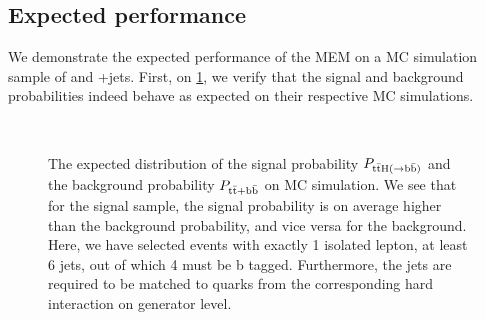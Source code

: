 \subsection{Expected performance}
We demonstrate the expected performance of the MEM on a MC simulation sample of \ttH and \ttbar+jets. First, on \cref{fig:mem_proba}, we verify that the signal and background probabilities indeed behave as expected on their respective MC simulations.

\begin{figure}
\begin{centering}
\\
\caption{The expected distribution of the signal probability $P_{\mathrm{t} \bar{\mathrm{t}} \mathrm{H} (\rightarrow \mathrm{b}\bar{\mathrm{b}})}$ and the background probability $P_{\mathrm{t} \bar{\mathrm{t}} + \mathrm{b}\bar{\mathrm{b}}}$ on MC simulation. We see that for the signal sample, the signal probability is on average higher than the background probability, and vice versa for the background. Here, we have selected events with exactly 1 isolated lepton, at least 6 jets, out of which 4 must be b tagged. Furthermore, the jets are required to be matched to quarks from the corresponding hard interaction on generator level.}
\label{fig:mem_proba}
\end{centering}
\end{figure}

